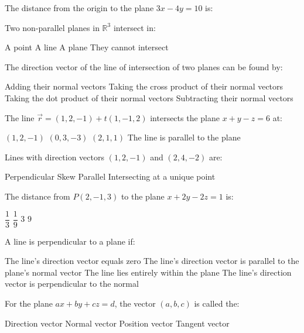 \documentclass[addpoints]{exam}
\begin{document}
\begin{questions}
\question[1] The distance from the origin to the plane $3x - 4y = 10$ is:
\begin{choices}
\end{choices}

\question[1] Two non-parallel planes in $\mathbb{R}^3$ intersect in:
\begin{choices}
    \choice A point
    \correctchoice A line
    \choice A plane
    \choice They cannot intersect
\end{choices}

\question[1] The direction vector of the line of intersection of two planes can be found by:
\begin{choices}
    \choice Adding their normal vectors
    \correctchoice Taking the cross product of their normal vectors
    \choice Taking the dot product of their normal vectors
    \choice Subtracting their normal vectors
\end{choices}

\question[1] The line $\vec{r} = (1,2,-1) + t(1,-1,2)$ intersects the plane $x+y-z=6$ at:
\begin{choices}
    \choice $(1,2,-1)$
    \correctchoice $(0,3,-3)$
    \choice $(2,1,1)$
    \choice The line is parallel to the plane
\end{choices}

\question[1] Lines with direction vectors $(1,2,-1)$ and $(2,4,-2)$ are:
\begin{choices}
    \choice Perpendicular
    \choice Skew
    \correctchoice Parallel
    \choice Intersecting at a unique point
\end{choices}

\question[1] The distance from $P(2,-1,3)$ to the plane $x + 2y - 2z = 1$ is:
\begin{choices}
    \choice $\dfrac{1}{3}$
    \choice $\dfrac{1}{9}$
    \correctchoice $3$
    \choice $9$
\end{choices}

\question[1] A line is perpendicular to a plane if:
\begin{choices}
    \choice The line's direction vector equals zero
    \correctchoice The line's direction vector is parallel to the plane's normal vector
    \choice The line lies entirely within the plane
    \choice The line's direction vector is perpendicular to the normal
\end{choices}

\question[1] For the plane $ax + by + cz = d$, the vector $(a, b, c)$ is called the:
\begin{choices}
    \choice Direction vector
    \correctchoice Normal vector
    \choice Position vector
    \choice Tangent vector
\end{choices}


\end{questions}
\end{document}
